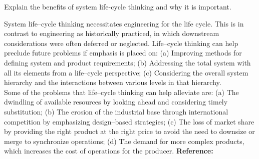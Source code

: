 \begin{exercises}
    \begin{exercise}
    \label{sea-2-10}
        Explain the benefits of system life-cycle thinking and why it is important.
    \end{exercise}
    \begin{solution}
        System life–cycle thinking necessitates engineering for the life cycle. This is in contrast to engineering as historically practiced, in which downstream considerations were often deferred or neglected. Life–cycle thinking can help preclude future problems if emphasis is placed on: (a) Improving methods for defining system and product requirements; (b) Addressing the total system with all its elements from a life–cycle perspective; (c) Considering the overall system hierarchy and the interactions between various levels in that hierarchy.\\
        Some of the problems that life–cycle thinking can help alleviate are: (a) The dwindling of available resources by looking ahead and considering timely substitution; (b) The erosion of the industrial base through international competition by emphasizing design–based strategies; (c) The loss of market share by providing the right product at the right price to avoid the need to downsize or merge to synchronize operations; (d) The demand for more complex products, which increases the cost of operations for the producer. \textbf{Reference:}
    \end{solution}
    

\end{exercises}
